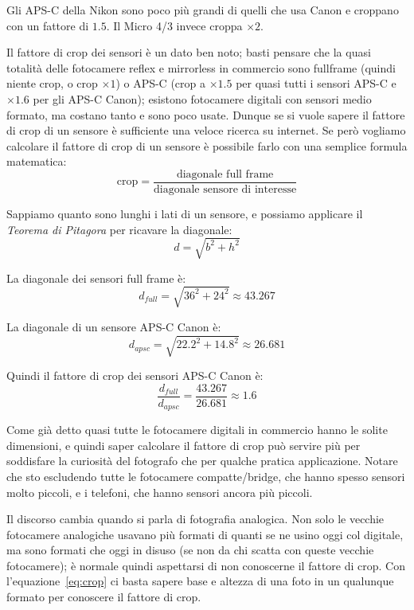 Gli APS-C della Nikon sono poco più grandi di quelli che usa Canon e croppano con un fattore di $1.5$. Il Micro 4/3 invece croppa $\times 2$.

Il fattore di crop dei sensori è un dato ben noto; basti pensare che la quasi totalità delle fotocamere reflex e mirrorless in commercio sono fullframe (quindi niente crop, o crop $\times 1$) o APS-C (crop a $\times 1.5$ per quasi tutti i sensori APS-C e $\times 1.6$ per gli APS-C Canon); esistono fotocamere digitali con sensori medio formato, ma costano tanto e sono poco usate. Dunque se si vuole sapere il fattore di crop di un sensore è sufficiente una veloce ricerca su internet.
Se però vogliamo calcolare il fattore di crop di un sensore è possibile farlo con una semplice formula matematica:
\begin{equation}
    \text{crop} = \dfrac{\text{diagonale full frame}}{\text{diagonale sensore di interesse}}
    \label{eq:crop}
\end{equation}


Sappiamo quanto sono lunghi i lati di un sensore, e possiamo applicare il \textit{Teorema di Pitagora} per ricavare la diagonale:
\[ d = \sqrt{b^2 + h^2} \]

La diagonale dei sensori full frame è:
\[ d_{full} = \sqrt{36^2 + 24^2} \approx 43.267 \]

La diagonale di un sensore APS-C Canon è:
\[ d_{apsc} = \sqrt{22.2^2 + 14.8^2} \approx 26.681 \]

Quindi il fattore di crop dei sensori APS-C Canon è:
\[ \dfrac{d_{full}}{d_{apsc}} = \dfrac{43.267}{26.681} \approx 1.6 \]

Come già detto quasi tutte le fotocamere digitali in commercio hanno le solite dimensioni, e quindi saper calcolare il fattore di crop può servire più per soddisfare la curiosità del fotografo che per qualche pratica applicazione. Notare che sto escludendo tutte le fotocamere compatte/bridge, che hanno spesso sensori molto piccoli, e i telefoni, che hanno sensori ancora più piccoli.

Il discorso cambia quando si parla di fotografia analogica.
Non solo le vecchie fotocamere analogiche usavano più formati di quanti se ne usino oggi col digitale, ma sono formati che oggi in disuso (se non da chi scatta con queste vecchie fotocamere); è normale quindi aspettarsi di non conoscerne il fattore di crop.
Con l'equazione~\ref{eq:crop} ci basta sapere base e altezza di una foto in un qualunque formato per conoscere il fattore di crop.


